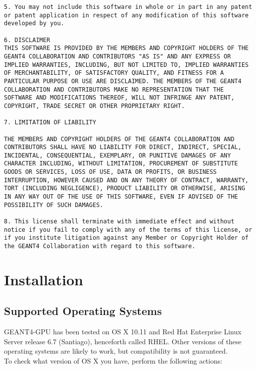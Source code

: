 \documentclass[12pt]{article}
\begin{document}
\begin{lstlisting}
5. You may not include this software in whole or in part in any patent or patent application in respect of any modification of this software developed by you.

6. DISCLAIMER
THIS SOFTWARE IS PROVIDED BY THE MEMBERS AND COPYRIGHT HOLDERS OF THE GEANT4 COLLABORATION AND CONTRIBUTORS "AS IS" AND ANY EXPRESS OR IMPLIED WARRANTIES, INCLUDING, BUT NOT LIMITED TO, IMPLIED WARRANTIES OF MERCHANTABILITY, OF SATISFACTORY QUALITY, AND FITNESS FOR A PARTICULAR PURPOSE OR USE ARE DISCLAIMED. THE MEMBERS OF THE GEANT4 COLLABORATION AND CONTRIBUTORS MAKE NO REPRESENTATION THAT THE SOFTWARE AND MODIFICATIONS THEREOF, WILL NOT INFRINGE ANY PATENT, COPYRIGHT, TRADE SECRET OR OTHER PROPRIETARY RIGHT.

7. LIMITATION OF LIABILITY

THE MEMBERS AND COPYRIGHT HOLDERS OF THE GEANT4 COLLABORATION AND CONTRIBUTORS SHALL HAVE NO LIABILITY FOR DIRECT, INDIRECT, SPECIAL, INCIDENTAL, CONSEQUENTIAL, EXEMPLARY, OR PUNITIVE DAMAGES OF ANY CHARACTER INCLUDING, WITHOUT LIMITATION, PROCUREMENT OF SUBSTITUTE GOODS OR SERVICES, LOSS OF USE, DATA OR PROFITS, OR BUSINESS INTERRUPTION, HOWEVER CAUSED AND ON ANY THEORY OF CONTRACT, WARRANTY, TORT (INCLUDING NEGLIGENCE), PRODUCT LIABILITY OR OTHERWISE, ARISING IN ANY WAY OUT OF THE USE OF THIS SOFTWARE, EVEN IF ADVISED OF THE POSSIBILITY OF SUCH DAMAGES.

8. This license shall terminate with immediate effect and without notice if you fail to comply with any of the terms of this license, or if you institute litigation against any Member or Copyright Holder of the GEANT4 Collaboration with regard to this software.
\end{lstlisting}
 
\section{Installation} %

\subsection{Supported Operating Systems} %
GEANT4-GPU has been tested on OS X 10.11 and Red Hat Enterprise Linux Server release 6.7 (Santiago), henceforth called RHEL. Other versions of these operating systems are likely to work, but compatibility is not guaranteed.\\

To check what version of OS X you have, perform the following actions:
\end{document}
